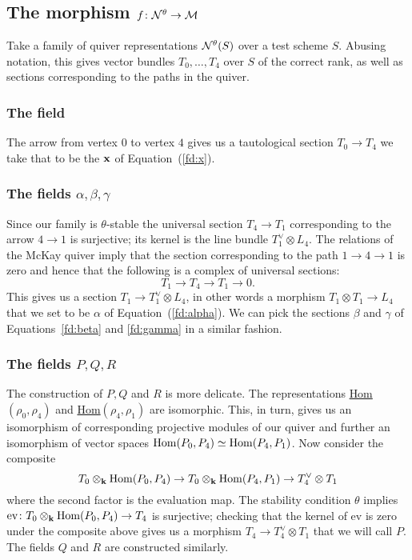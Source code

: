 \documentclass{amsart}
\theoremstyle{definition}
\begin{document}
\subsection{The morphism $f \colon \mathcal{N}^\theta \rightarrow \mathcal{M}$}

Take a family of quiver representations $\mathcal{N}^\theta(S)$ over a test scheme $S$.
Abusing notation, this gives vector bundles $T_0, \ldots, T_4$ over $S$ of the correct rank, as well as sections corresponding to the paths in the quiver.

\subsubsection{The field \bfx}

The arrow from vertex $0$ to vertex $4$ gives us a tautological section $T_0 \rightarrow T_4$ we take that to be the $\mathbf{x}$ of Equation~(\ref{fd:x}).

\subsubsection{The fields $\alpha, \beta, \gamma$}

Since our family is $\theta$-stable the universal section $T_4 \rightarrow T_1$ corresponding to the arrow $4 \rightarrow 1$ is surjective; its kernel is the line bundle $T_1^\vee \otimes L_4$.
The relations of the McKay quiver imply that the section corresponding to the path $1 \rightarrow 4 \rightarrow 1$ is zero and hence that the following is a complex of universal sections:
$$T_1 \rightarrow T_4 \rightarrow T_1 \rightarrow 0.$$
This gives us a section $T_1 \rightarrow T_1^\vee \otimes L_4$, in other words a morphism $T_1 \otimes T_1 \rightarrow L_4$ that we set to be $\alpha$ of Equation~(\ref{fd:alpha}).
We can pick the sections $\beta$ and $\gamma$ of Equations~\ref{fd:beta} and \ref{fd:gamma} in a similar fashion.

\subsubsection{The fields $P, Q, R$}

The construction of $P,Q$ and $R$ is more delicate.
The representations \underline{Hom}$(\rho_0, \rho_4)$ and \underline{Hom}$(\rho_4, \rho_1)$ are isomorphic.
This, in turn, gives us an isomorphism of corresponding projective modules of our quiver and further an isomorphism of vector spaces $\operatorname{Hom}(P_0, P_4) \simeq \operatorname{Hom}(P_4, P_1)$.
Now consider the composite $$T_0 \otimes_{\mathbf{k}} \operatorname{Hom}(P_0, P_4) \rightarrow T_0 \otimes_{\mathbf{k}} \operatorname{Hom}(P_4, P_1) \rightarrow T_4^\vee \otimes T_1$$ where the second factor is the evaluation map.
The stability condition $\theta$ implies $\text{ev} \colon T_0 \otimes_{\mathbf{k}} \operatorname{Hom}(P_0, P_4) \rightarrow T_4$ is surjective; checking that the kernel of ev is zero under the composite above gives us a morphism $T_4 \rightarrow T_4^\vee \otimes T_1$ that we will call $P$. 
The fields $Q$ and $R$ are constructed similarly.
\end{document}
